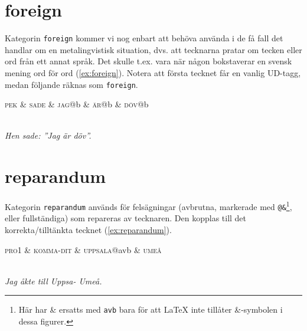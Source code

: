 \documentclass[11pt,a4paper]{article}
\begin{document}
\section{foreign}
Kategorin \texttt{foreign} kommer vi nog enbart att behöva använda i de få fall det handlar om en metalingvistisk situation, dvs. att tecknarna pratar om tecken eller ord från ett annat språk. Det skulle t.ex. vara när någon bokstaverar en svensk mening ord för ord (\ref{ex:foreign}). Notera att första tecknet får en vanlig UD-tagg, medan följande räknas som \texttt{foreign}.

\begin{example}
\label{ex:foreign}
\begin{dependency}[theme = simple]
   \begin{deptext}[column sep=1em]
      \textsc{pek} \& \textsc{sade} \& \textsc{jag}@b \& \textsc{är}@b \& \textsc{döv}@b \\
   \end{deptext}
\end{dependency}
\\
\textit{Hen sade: ''Jag är döv''.}
\end{example}


\section{reparandum}
Kategorin \texttt{reparandum} används för felsägningar (avbrutna, markerade med \texttt{@\&}\footnote{Här har \& ersatts med \texttt{avb} bara för att {\LaTeX} inte tillåter {\&}-symbolen i dessa figurer.}, eller fullständiga) som repareras av tecknaren. Den kopplas till det korrekta/tilltänkta tecknet (\ref{ex:reparandum}).

\begin{example}
\label{ex:reparandum}
\begin{dependency}[theme = simple]
   \begin{deptext}[column sep=1em]
      \textsc{pro1} \& \textsc{komma-dit} \& \textsc{uppsala}@avb \& \textsc{umeå}\\
   \end{deptext}
\end{dependency}
\\
\textit{Jag åkte till Uppsa- Umeå.}
\end{example}
\end{document}
